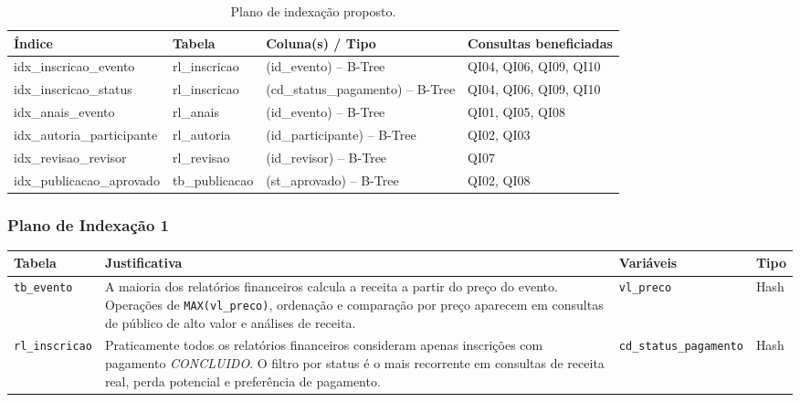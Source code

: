 \documentclass[12pt]{article}
\begin{document}
\begin{table}[htb]
\centering
\caption{Plano de indexação proposto.}
\label{tab:indices}
\small
\begin{tabularx}{\textwidth}{|l|l|l|X|}
\hline
\textbf{Índice} & \textbf{Tabela} & \textbf{Coluna(s) / Tipo} & \textbf{Consultas beneficiadas} \\
\hline
idx\_inscricao\_evento    & rl\_inscricao    & (id\_evento) -- B-Tree       & QI04, QI06, QI09, QI10 \\
idx\_inscricao\_status    & rl\_inscricao    & (cd\_status\_pagamento) -- B-Tree & QI04, QI06, QI09, QI10 \\
idx\_anais\_evento        & rl\_anais        & (id\_evento) -- B-Tree       & QI01, QI05, QI08 \\
idx\_autoria\_participante & rl\_autoria     & (id\_participante) -- B-Tree & QI02, QI03 \\
idx\_revisao\_revisor     & rl\_revisao      & (id\_revisor) -- B-Tree      & QI07 \\
idx\_publicacao\_aprovado & tb\_publicacao   & (st\_aprovado) -- B-Tree     & QI02, QI08 \\
\hline
\end{tabularx}
\end{table}

\subsubsection*{Plano de Indexação 1}
\begin{tabularx}{\textwidth}{|l|X|l|l|}
\hline
\textbf{Tabela} & \textbf{Justificativa} & \textbf{Variáveis} & \textbf{Tipo} \\
\hline
\texttt{tb\_evento} & A maioria dos relatórios financeiros calcula a receita a partir do preço do evento. Operações de \texttt{MAX(vl\_preco)}, ordenação e comparação por preço aparecem em consultas de público de alto valor e análises de receita. & \texttt{vl\_preco} & Hash \\
\hline
\texttt{rl\_inscricao} & Praticamente todos os relatórios financeiros consideram apenas inscrições com pagamento \textit{CONCLUIDO}. O filtro por status é o mais recorrente em consultas de receita real, perda potencial e preferência de pagamento. & \texttt{cd\_status\_pagamento} & Hash \\
\hline
\end{tabularx}

\bigskip
\end{document}
